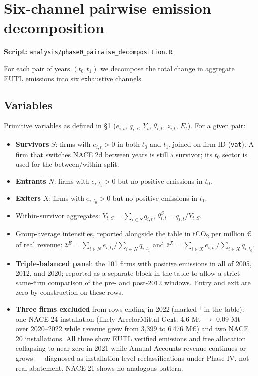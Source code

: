 \documentclass[11pt]{article}
\begin{document}
\bigskip

\section{Six-channel pairwise emission decomposition}
\label{sec:pairwise}

\textbf{Script:} \texttt{analysis/phase0\_pairwise\_decomposition.R}.

For each pair of years $(t_0, t_1)$ we decompose the total change in aggregate EUTL emissions into six exhaustive channels.

\subsection{Variables}

Primitive variables as defined in \S1 ($e_{i,t}$, $q_{i,t}$, $Y_t$, $\theta_{i,t}$, $z_{i,t}$, $E_t$). For a given pair:
\begin{itemize}
  \item \textbf{Survivors} $S$: firms with $e_{i,t} > 0$ in both $t_0$ and $t_1$, joined on firm ID (\texttt{vat}). A firm that switches NACE 2d between years is still a survivor; its $t_0$ sector is used for the between/within split.
  \item \textbf{Entrants} $N$: firms with $e_{i,t_1} > 0$ but no positive emissions in $t_0$.
  \item \textbf{Exiters} $X$: firms with $e_{i,t_0} > 0$ but no positive emissions in $t_1$.
  \item Within-survivor aggregates: $Y_{t,S} = \sum_{i \in S} q_{i,t}$, $\theta_{i,t}^S = q_{i,t}/Y_{t,S}$.
  \item Group-average intensities, reported alongside the table in tCO\textsubscript{2} per million \euro{} of real revenue: $\bar z^E = \sum_{i \in N} e_{i,t_1} / \sum_{i \in N} q_{i,t_1}$ and $\bar z^X = \sum_{i \in X} e_{i,t_0} / \sum_{i \in X} q_{i,t_0}$.
  \item \textbf{Triple-balanced panel}: the 101 firms with positive emissions in all of 2005, 2012, and 2020; reported as a separate block in the table to allow a strict same-firm comparison of the pre- and post-2012 windows. Entry and exit are zero by construction on these rows.
  \item \textbf{Three firms excluded} from rows ending in 2022 (marked $^{\ddagger}$ in the table): one NACE 24 installation (likely ArcelorMittal Gent: 4.6 Mt $\to$ 0.09 Mt over 2020--2022 while revenue grew from 3{,}399 to 6{,}476 M\euro{}) and two NACE 20 installations. All three show EUTL verified emissions and free allocation collapsing to near-zero in 2021 while Annual Accounts revenue continues or grows --- diagnosed as installation-level reclassifications under Phase IV, not real abatement. NACE 21 shows no analogous pattern.
\end{itemize}
\end{document}
